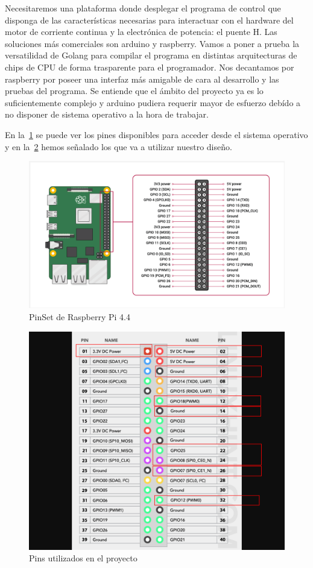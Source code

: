 
Necesitaremos una plataforma donde desplegar el programa de control que disponga de las características necesarias para interactuar con el hardware del  motor de corriente continua y la electrónica de potencia: el puente H. Las soluciones más comerciales son arduino y raspberry.
Vamos a poner a prueba la versatilidad de Golang para compilar el programa en distintas arquitecturas de chips de CPU de forma trasparente para el programador.
Nos decantamos por raspberry por poseer una interfaz más amigable de cara al desarrollo y las pruebas del programa.
Se entiende que el ámbito del proyecto ya es lo suficientemente complejo y arduino pudiera requerir mayor de esfuerzo debído a no disponer de sistema operativo a la hora de trabajar.

En la~\cref{fig:raspberry pins} se puede ver los pines disponibles para acceder desde el sistema operativo y en la~\cref{fig:Used Pins} hemos señalado los que va a utilizar nuestro diseño.

\begin{figure}[H]
    \centering
    \includegraphics[scale = 0.4]{part/Proyecto_ejecutivo/memoria_constructiva/raspb/img/raspberry}
    \caption{PinSet de Raspberry Pi 4.4\cite{raspberryORG} }\label{fig:raspberry pins}
\end{figure}

\begin{figure}[H]
    \centering
    \includegraphics[scale = 0.4]{part/Proyecto_ejecutivo/memoria_constructiva/raspb/img/gpio-pinout-raspberry-pi-01-used}
    \caption{Pins utilizados en el proyecto}\label{fig:Used Pins}
\end{figure}